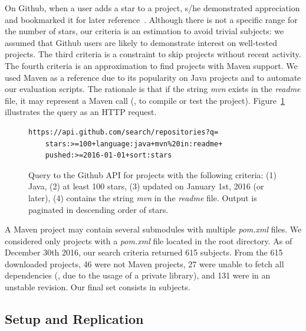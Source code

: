 On Github, when a user adds a star to a project, s/he demonstrated
appreciation and bookmarked it for later
reference~\cite{github-stars}.  Although there is not a specific range
for the number of stars, our criteria is an estimation to avoid
trivial subjects: we assumed that Github users are likely to
demonstrate interest on well-tested projects. The third criteria is a
constraint to skip projects without recent activity. The fourth
criteria is an approximation to find projects with Maven support. We
used Maven as a reference due to its popularity on Java projects and
to automate our evaluation scripts. The rationale is that if the
string \emph{mvn} exists in the \emph{readme} file, it may represent a
Maven call (\eg, to compile or test the project).
Figure~\ref{fig:subject-query} illustrates the query as an HTTP
request.

\begin{figure}[h!]
\centering
\scriptsize
{}
\begin{lstlisting}
https://api.github.com/search/repositories?q=
    stars:>=100+language:java+mvn%20in:readme+
    pushed:>=2016-01-01+sort:stars

\end{lstlisting}
\caption{\label{fig:subject-query} Query to the Github API for
    projects with the following criteria: (1) Java, (2) at least 100
    stars, (3) updated on January 1st, 2016 (or later), (4) contains
    the string \emph{mvn} in the \emph{readme} file. Output is
    paginated in descending order of stars.}
\end{figure}

A Maven project may contain several submodules with multiple
\emph{pom.xml} files. We considered only projects with a
\emph{pom.xml} file located in the root directory.  As of December
30th 2016, our search criteria returned 615 subjects. From the 615
downloaded projects, 46 were not Maven projects, 27 were unable to
fetch all dependencies (\eg, due to the usage of a private library),
and 131 were in an unstable revision. Our final set consists in
\numSubjs{} subjects.

\subsection{Setup and Replication}
\label{sec:setup}

